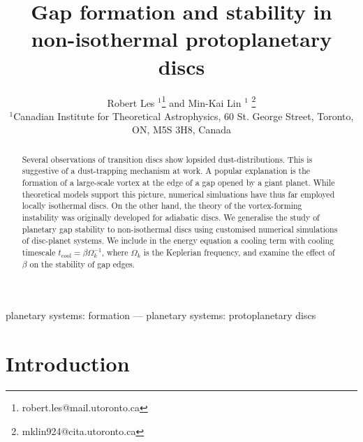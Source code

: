 \documentclass[useAMS,usenatbib]{mn2e}
\title[Gaps in non-isothermal discs]{Gap formation and stability in 
  non-isothermal protoplanetary discs}
\author[Les and Lin]{Robert Les
  $^1$\thanks{robert.les@mail.utoronto.ca} and Min-Kai Lin $^1$
  \thanks{ mklin924@cita.utoronto.ca} \\ 
$^1$Canadian Institute for Theoretical Astrophysics,  
60 St. George Street, Toronto, ON, M5S 3H8, Canada \\
}
\begin{document}
\maketitle
\begin{abstract}
Several observations of transition discs show lopsided
dust-distributions. This is suggestive of a dust-trapping mechanism at work. A
popular explanation is the formation of a large-scale vortex at the
edge of a gap opened by a giant planet. While theoretical models
support this picture, numerical simluations have thus far
employed locally isothermal discs. On the other hand, the theory of the
vortex-forming instability was originally developed for adiabatic
discs. We generalise the study of planetary gap stability to non-isothermal
discs using customised numerical simulations of disc-planet
systems. We include in the energy equation a cooling term with cooling
timescale $t_\mathrm{cool}=\beta\Omega_k^{-1}$, where $\Omega_k$ is
the Keplerian frequency, and examine the effect of $\beta$ on the
stability of gap edges.  


\end{abstract}

\begin{keywords}
planetary systems: formation --- planetary systems:
protoplanetary discs
\end{keywords}


\section{Introduction}\label{intro}



%
%





\appendix
%
%
\end{document}
